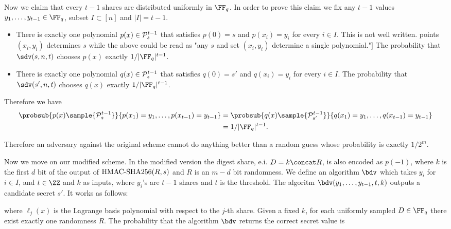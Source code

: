 \documentclass[envcountsame,runningheads,notitlepage]{llncs}
\DeclareRobustCommand{\michals}[2] {{\color{magenta}{$\big[$\scriptsize\textsf{Michal #1:}} #2$\big]$}}
\begin{document}
	
	Now we claim that every $t-1$ shares are distributed uniformly in $\FF_q$. 
	In order to prove this claim we fix any $t-1$ values $y_1, \ldots, y_{t-1} \in \FF_q$, subset  $I \subset [n]$ and $|I| = t-1$. 
	\begin{itemize}
	 	\item There is exactly one polynomial $p(x) \in {\mathcal P}_{s}^{t - 1}$ that satisfies $p(0) = s$ and $p(x_{i}) = y_{i}$ for every $i \in I$. \michals{29.03}{This is not well written. points $(x_i, y_i)$ determines $s$ while the above could be read as "any $s$ and set $(x_i, y_i)$ determine a single polynomial."}
	 	The probability that $\sdv(s, n, t)$ chooses $p(x)$ exactly $1/|\FF_q|^{t-1}$.
	 	\item There is exactly one polynomial $q(x) \in {\mathcal P}_{s}^{t - 1}$ that satisfies $q(0) = s'$ and $q(x_{i}) = y_{i}$ for every $i \in I$. 
	 	The probability that $\sdv(s', n, t)$ chooses $q(x)$ exactly $1/|\FF_q|^{t-1}$.
	\end{itemize}
	Therefore we have
	\begin{align*}
		\probsub{p(x) \sample {\sP_{s}^{t - 1}}}{p(x_1) = y_1, \ldots, p(x_{t-1}) = y_{t-1}} &= \probsub{q(x) \sample {\sP_{s'}^{t - 1}}}{q(x_1) = y_1, \ldots, q(x_{t-1}) = y_{t-1}} \\
		&= 1/|\FF_q|^{t-1}.
	\end{align*}
	
	Therefore an adversary against the original scheme cannot do anything better than a random guess whose probability is exactly $1/2^m$.
	
	Now we move on our modified scheme. 	
	In the modified version the digest share, e.i. $D = k \concat R$, is also encoded as $p(-1)$, where  $k$ is the first $d$ bit of the output of ${\textrm{HMAC-SHA256}}(R, s)$ and $R$ is an $m - d$ bit randomness. 
	We define an algorithm $\bdv$ which takes $y_i$ for $i \in I$, and $t \in \ZZ$ and $k$ as inputs, where $y_i$'s are $t - 1$ shares and $t$ is the threshold.
	The algoritm $\bdv(y_1, \ldots, y_{t-1}, t, k)$ outputs a candidate secret $s'$. It works as follows:
	
	where $\ell_{j}(x)$ is the  Lagrange basis polynomial with respect to the $j$-th share.
	Given a fixed $k$, for each uniformly sampled $D \in \FF_q$ there exist exactly one randomness $R$.  
	The probability that the algorithm $\bdv$ returns the correct secret value is 
	
\end{document}
